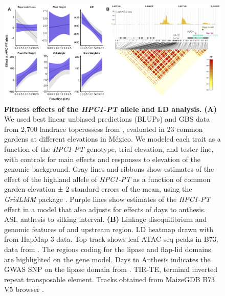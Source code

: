\begin{figure}[htp]
\centering
\includegraphics[width=\linewidth]{Chapter-1/figs/Fig_5.png}
\caption[Fitness effects of the \textit{HPC1-PT} allele and \hpc LD analysis.]{\textbf{Fitness effects of the \textit{HPC1-PT} allele and \hpc LD analysis.} \textbf{(A)}
We used best linear unbiased predictions (BLUPs) and GBS data from 2,700 landrace topcrossess from \citep{gates2019-xu}, evaluated in 23 common gardens at different elevations in M\'exico. 
We modeled each trait as a function of the \textit{HPC1-PT} genotype, trial elevation, and tester line, with controls for main effects and responses to elevation of the genomic background. 
Gray lines and ribbons show estimates of the effect of the highland allele of \textit{HPC1-PT} as a function of common garden elevation ± 2 standard errors of the mean, using the \textit{GridLMM} package \citep{runcie2019-gr}. 
Purple lines show estimates of the \textit{HPC1-PT} effect in a model that also adjusts for effects of days to anthesis. ASI, anthesis to silking interval. 
\textbf{(B)} Linkage disequilibrium and genomic features of \hpc and upstream region. 
LD heatmap drawn with \citep{zhou2019} from HapMap 3 data. 
Top track shows leaf ATAC-seq peaks in B73, data from \citep{ricci2019-zj}.
The regions coding for the lipase and flap-lid domains are highlighted on the  gene model.
Days to Anthesis indicates the GWAS SNP on the lipase domain from \citep{wallace2014-yy}.
TIR-TE, terminal inverted repeat transposable element.
Tracks obtained from MaizeGDB B73 V5 browser \citep{woodhouse2021-wd}.}
\label{Fig5}
\end{figure}

